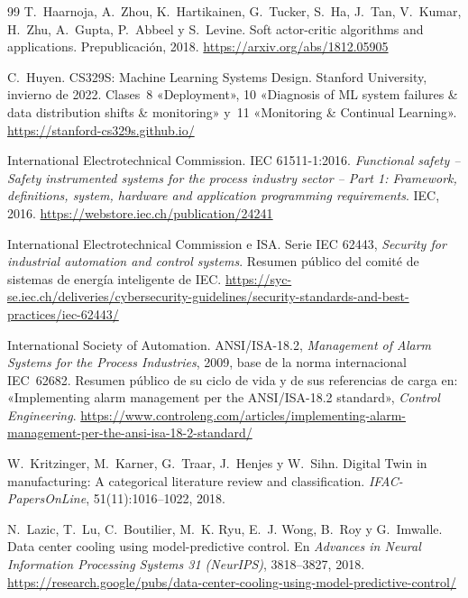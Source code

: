 \begin{thebibliography}{99}
T.~Haarnoja, A.~Zhou, K.~Hartikainen, G.~Tucker, S.~Ha, J.~Tan, V.~Kumar, H.~Zhu, A.~Gupta, P.~Abbeel y S.~Levine.
\newblock Soft actor-critic algorithms and applications.
\newblock Prepublicación, 2018.
\newblock \url{https://arxiv.org/abs/1812.05905}

C.~Huyen.
\newblock CS329S: Machine Learning Systems Design.
\newblock Stanford University, invierno de 2022. Clases~8 «Deployment», 10 «Diagnosis of ML system failures \& data distribution shifts \& monitoring» y~11 «Monitoring \& Continual Learning».
\newblock \url{https://stanford-cs329s.github.io/}

International Electrotechnical Commission.
\newblock IEC 61511-1:2016. \emph{Functional safety -- Safety instrumented systems for the process industry sector -- Part 1: Framework, definitions, system, hardware and application programming requirements}.
\newblock IEC, 2016.
\newblock \url{https://webstore.iec.ch/publication/24241}

International Electrotechnical Commission e ISA.
\newblock Serie IEC 62443, \emph{Security for industrial automation and control systems}.
\newblock Resumen público del comité de sistemas de energía inteligente de IEC.
\newblock \url{https://syc-se.iec.ch/deliveries/cybersecurity-guidelines/security-standards-and-best-practices/iec-62443/}

International Society of Automation.
\newblock ANSI/ISA-18.2, \emph{Management of Alarm Systems for the Process Industries}, 2009, base de la norma internacional IEC~62682. Resumen público de su ciclo de vida y de sus referencias de carga en: «Implementing alarm management per the ANSI/ISA-18.2 standard», \emph{Control Engineering}.
\newblock \url{https://www.controleng.com/articles/implementing-alarm-management-per-the-ansi-isa-18-2-standard/}

W.~Kritzinger, M.~Karner, G.~Traar, J.~Henjes y W.~Sihn.
\newblock Digital Twin in manufacturing: A categorical literature review and classification.
\newblock \emph{IFAC-PapersOnLine}, 51(11):1016--1022, 2018.

N.~Lazic, T.~Lu, C.~Boutilier, M.~K. Ryu, E.~J. Wong, B.~Roy y G.~Imwalle.
\newblock Data center cooling using model-predictive control.
\newblock En \emph{Advances in Neural Information Processing Systems 31 (NeurIPS)}, 3818--3827, 2018.
\newblock \url{https://research.google/pubs/data-center-cooling-using-model-predictive-control/}


\end{thebibliography}
